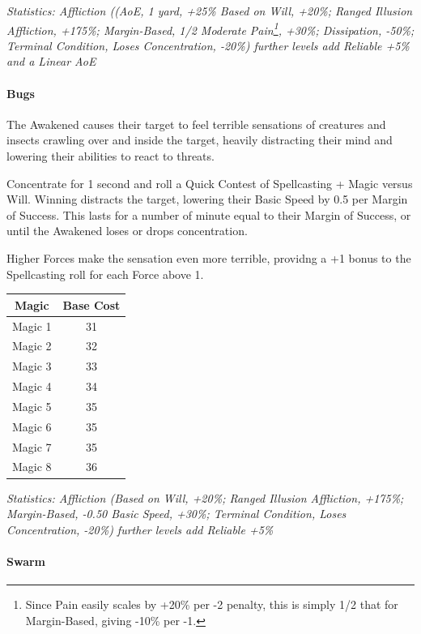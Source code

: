 \begin{multicols*}{3}
	\textcolor{OliveGreen}{\textit{Statistics: Affliction ((AoE, 1 yard, +25\% Based on Will, +20\%; Ranged Illusion Affliction, +175\%; Margin-Based, 1/2 Moderate Pain\footnote{Since Pain easily scales by +20\% per -2 penalty, this is simply 1/2 that for Margin-Based, giving -10\% per -1.}, +30\%; Dissipation, -50\%; Terminal Condition, Loses Concentration, -20\%)  further levels add Reliable +5\% and a Linear AoE}}
	
	\paragraph{Bugs}
	
	The Awakened causes their target to feel terrible sensations of creatures and insects crawling over and inside the target, heavily distracting their mind and lowering their abilities to react to threats.
	
	Concentrate for 1 second and roll a Quick Contest of Spellcasting + Magic versus Will. Winning distracts the target, lowering their Basic Speed by 0.5 per Margin of Success. This lasts for a number of minute equal to their Margin of Success, or until the Awakened loses or drops concentration.
	
	Higher Forces make the sensation even more terrible, providng a +1 bonus to the Spellcasting roll for each Force above 1.
		
	\begin{center}
		\begin{tabular}{|c|c|}
			\hline
			Magic & Base Cost \\
			\hline
			\hline
			Magic 1 & 31 \\
			Magic 2 & 32 \\
			Magic 3 & 33 \\
			Magic 4 & 34 \\
			Magic 5 & 35 \\
			Magic 6 & 35 \\
			Magic 7 & 35 \\
			Magic 8 & 36 \\
			\hline
		\end{tabular}
	\end{center}
	
	\textcolor{OliveGreen}{\textit{Statistics: Affliction (Based on Will, +20\%; Ranged Illusion Affliction, +175\%; Margin-Based, -0.50 Basic Speed, +30\%; Terminal Condition, Loses Concentration, -20\%)  further levels add Reliable +5\%}}
	
	\paragraph{Swarm}
	

\end{multicols*}
